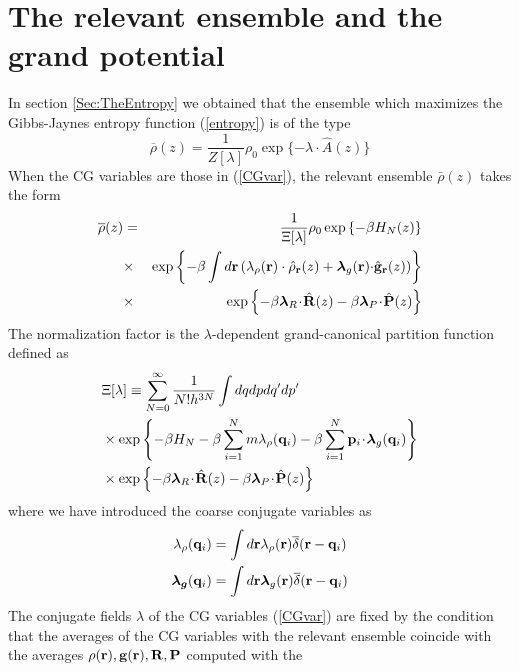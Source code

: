 \documentclass[b5paper,openright,11pt]{book}
\newcommand{\esc}{\!\cdot\!}
\begin{document}
\section{The relevant ensemble and the grand potential}
In section \ref{Sec:TheEntropy} we obtained that the ensemble which maximizes the Gibbs-Jaynes entropy function (\ref{entropy}) is of the type
\begin{equation}
\overline{\rho}(z) = \frac{1}{Z[\lambda]} \rho_0\exp\{-\lambda\!\cdot\!\hat{A}(z)\}
\end{equation}
When the CG variables are those in (\ref{CGvar}), the relevant ensemble $\bar{\rho}(z)$ takes the form
\begin{eqnarray}
  \overline{\rho}(z)&=&\frac{1}{\Xi[\lambda]}\rho_0\exp\left\{-\beta H_N(z)\right\}
\nonumber\\
&\times&
\exp\left\{-\beta\int d{\bf r}\left(\lambda_\rho({\bf r})\cdot\hat{\rho}_{\bf
    r}(z)+\boldsymbol{\lambda}_g{({\bf r})\cdot}\hat{\bf g}_{\bf r}(z)\right)\right\}
\nonumber\\
&\times&
\exp\left\{-\beta \boldsymbol{\lambda}_{R}\esc\hat{\bf R}(z)
-\beta \boldsymbol{\lambda}_{P}\esc\hat{\bf P}(z)\right\}
\nonumber\\
\label{relensln}
\end{eqnarray}
The   normalization   factor   is  the   $\lambda$-dependent
grand-canonical partition function defined as
\begin{align}
&\Xi[\lambda]
\equiv
 \sum_{N=0}^\infty \frac{1}{N!h^{3N}}
\int dqdp dq'dp'
\nonumber\\
&\times\exp\left\{-\beta H_N-\beta \sum_{i=1}^Nm \lambda_\rho({\bf
    q}_i)-\beta \sum_{i=1}^N{\bf p}_i\esc\boldsymbol{\lambda}_g({\bf q}_i)\right\}
\nonumber\\
&\times\exp\left\{-\beta \boldsymbol{\lambda}_{R}\esc\hat{\bf R}(z)
-\beta \boldsymbol{\lambda}_{P}\esc\hat{\bf P}(z)\right\}
\label{xiln}
\end{align}
where we have introduced the coarse conjugate variables as
  \begin{align}
\lambda_\rho({\bf q}_i)&=
\int d{\bf r}\lambda_{\rho}({\bf r})\overline{\delta}({\bf r}-{\bf q}_i)
\nonumber\\
\boldsymbol{\lambda_g}({\bf q}_i)&=
\int d{\bf r}\boldsymbol{\lambda}_g({\bf r})\overline{\delta}({\bf r}-{\bf q}_i)
  \end{align}
The conjugate fields $\lambda$ of the CG variables (\ref{CGvar}) are fixed by the condition that the averages of the CG variables with the relevant ensemble coincide with the averages $\rho({\bf  r}),{\bf  g}({\bf
  r}),{\bf  R},{\bf  P}$  computed  with  the 
\end{document}
